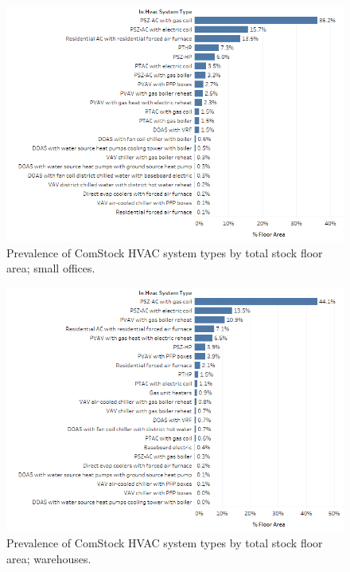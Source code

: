 \begin{figure}
    \centering \includegraphics[width=1.0\textwidth]{figures/HVAC_SYS_Type_PREV_Small_Office.png}
    \caption[HVAC system type prevalence in small offices]{Prevalence of ComStock HVAC system types by total stock floor area; small offices.}
    \label{fig:hvac_sys_type_prevalence_small_office}
\end{figure}

\begin{figure}
    \centering \includegraphics[width=1.0\textwidth]{figures/HVAC_SYS_Type_PREV_Warehouse.png}
    \caption[HVAC system type prevalence in warehouses]{Prevalence of ComStock HVAC system types by total stock floor area; warehouses.}
    \label{fig:hvac_sys_type_prevalence_warehouse}
\end{figure}

